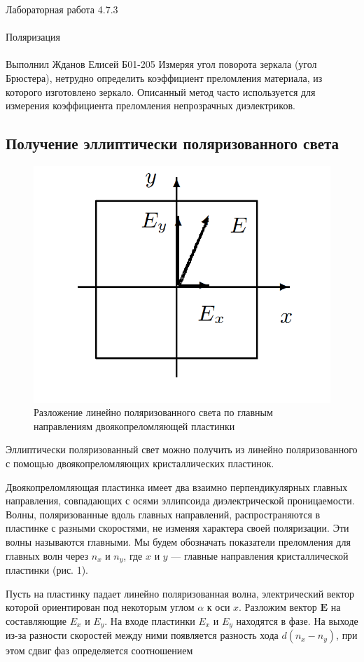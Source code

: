 \documentclass{astroedu-lab}
\begin{document}
\begin{problem}{\huge Лабораторная работа 4.7.3\\\\Поляризация\\\\Выполнил Жданов Елисей Б01-205}
Измеряя угол поворота зеркала (угол Брюстера), нетрудно определить коэффициент преломления материала, из которого изготовлено
зеркало. Описанный метод часто используется для измерения коэффициента преломления непрозрачных диэлектриков.

\subsection{Получение эллиптически поляризованного света}
\begin{figure} 
	\includegraphics[width=\linewidth]{1}
	\caption{Разложение линейно поляризованного света по главным направлениям двоякопреломляющей пластинки}
	\label{ris 1}
\end{figure}

Эллиптически поляризованный свет можно получить из линейно поляризованного с
помощью двоякопреломляющих кристаллических пластинок.

Двоякопреломляющая пластинка имеет два взаимно перпендикулярных главных направления, совпадающих с осями эллипсоида диэлектрической проницаемости. Волны, поляризованные вдоль главных направлений, распространяются в пластинке с разными скоростями, не изменяя характера своей поляризации. Эти волны называются главными. Мы будем обозначать показатели преломления для главных волн через $ n_x $ и $ n_y $, где $ x $ и $ y $ --- главные направления кристаллической пластинки (рис. 1).

Пусть на пластинку падает линейно поляризованная волна, электрический вектор которой ориентирован под некоторым углом $ \alpha $ к оси
$ x $. Разложим вектор $ \mathbf{E} $ на составляющие $ E_x $ и $ E_y $. На входе пластинки $ E_x $ и $ E_y $ находятся в фазе. На выходе из-за разности скоростей между ними появляется разность хода $ d(n_x - n_y) $, при этом сдвиг фаз определяется соотношением


\end{problem}
\end{document}
